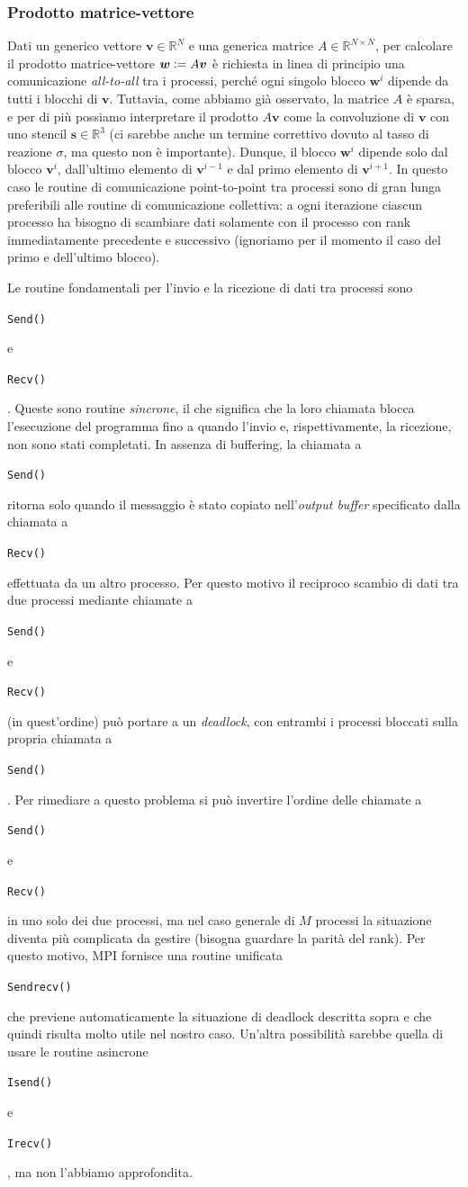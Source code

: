\documentclass[a4paper,11pt]{article}
\renewcommand{\vec}[1]{\bm{#1}}
\newcommand{\R}{\mathbb{R}}
\newcommand{\deq}{\vcentcolon=}
\newcommand{\code}[1]{\begin{small}\texttt{#1}\end{small}}
\begin{document}
\subsubsection*{Prodotto matrice-vettore}
Dati un generico vettore $\vec{v} \in \R^N$
e una generica matrice $A \in \R^{N \times N}$,
per calcolare il prodotto matrice-vettore
$\vec{w} \deq A \vec{v}$ è richiesta in linea
di principio una comunicazione \emph{all-to-all} tra i processi,
perché ogni singolo blocco $\vec{w}^i$ dipende
da tutti i blocchi di $\vec{v}$.
Tuttavia, come abbiamo già osservato, la matrice $A$ è sparsa,
e per di più possiamo interpretare il prodotto $A \vec{v}$
come la convoluzione di $\vec{v}$ con uno stencil
$\vec{s} \in \R^3$ (ci sarebbe anche un termine
correttivo dovuto al tasso di reazione $\sigma$,
ma questo non è importante).
Dunque, il blocco $\vec{w}^i$ dipende solo dal blocco
$\vec{v}^i$, dall'ultimo elemento di $\vec{v}^{i-1}$
e dal primo elemento di $\vec{v}^{i+1}$.
In questo caso le routine di comunicazione point-to-point
tra processi sono di gran lunga preferibili alle routine
di comunicazione collettiva: a ogni iterazione ciascun
processo ha bisogno di scambiare dati solamente con il
processo con rank immediatamente precedente e successivo
(ignoriamo per il momento il caso del primo e dell'ultimo
blocco).

Le routine fondamentali per l'invio e la ricezione di dati
tra processi sono \code{Send()} e \code{Recv()}.
Queste sono routine \emph{sincrone}, il che significa
che la loro chiamata blocca l'esecuzione del programma
fino a quando l'invio e, rispettivamente, la ricezione,
non sono stati completati. In assenza di buffering,
la chiamata a \code{Send()} ritorna solo quando il messaggio
è stato copiato nell'\emph{output buffer} specificato
dalla chiamata a \code{Recv()} effettuata da un altro processo.
Per questo motivo il reciproco scambio di dati tra
due processi mediante chiamate a \code{Send()} e
\code{Recv()} (in quest'ordine) può portare a un
\emph{deadlock}, con entrambi i processi
bloccati sulla propria chiamata a \code{Send()}.
%
Per rimediare a questo problema si può invertire l'ordine
delle chiamate a \code{Send()} e \code{Recv()} in uno
solo dei due processi, ma nel caso generale di $M$ processi
la situazione diventa più complicata da gestire (bisogna
guardare la parità del rank). Per questo motivo, MPI
fornisce una routine unificata \code{Sendrecv()} che
previene automaticamente la situazione di deadlock descritta
sopra e che quindi risulta molto utile nel nostro caso.
Un'altra possibilità sarebbe quella di usare le
routine asincrone \code{Isend()} e \code{Irecv()},
ma non l'abbiamo approfondita.
\end{document}
